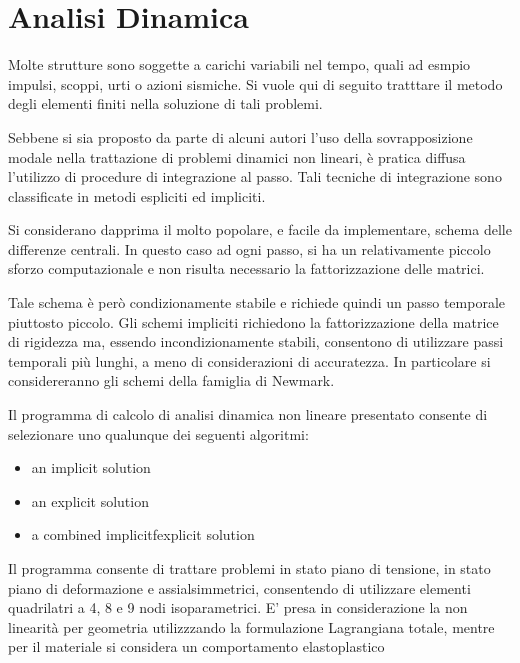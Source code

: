 \chapter{Analisi Dinamica}		
Molte strutture sono soggette a carichi variabili nel tempo, quali ad esmpio impulsi, scoppi, urti o azioni sismiche. Si vuole qui di seguito tratttare il metodo degli elementi finiti nella soluzione di tali problemi.

Sebbene si sia proposto da parte di alcuni autori l'uso della sovrapposizione modale nella trattazione di problemi dinamici non lineari, è pratica diffusa l'utilizzo di procedure di integrazione al passo. Tali tecniche di integrazione sono classificate in metodi espliciti ed impliciti.

Si considerano dapprima il molto popolare, e facile da implementare, schema delle differenze centrali.
In questo caso ad ogni passo, si ha un relativamente piccolo sforzo computazionale e non risulta necessario la fattorizzazione delle matrici.

Tale schema è però condizionamente stabile e richiede quindi un passo temporale piuttosto piccolo.
Gli schemi impliciti richiedono la fattorizzazione della matrice di rigidezza ma, essendo incondizionamente stabili, consentono di utilizzare passi temporali più lunghi, a meno di considerazioni di accuratezza. In particolare si considereranno gli schemi della famiglia di Newmark.

Il programma di calcolo di analisi dinamica non lineare presentato consente di selezionare uno qualunque dei seguenti algoritmi:
\begin{itemize}
	\item an implicit solution
	\item an explicit solution
	\item a combined implicitfexplicit solution
\end{itemize}

Il programma consente di trattare problemi in stato piano di tensione, in stato piano di deformazione e assialsimmetrici, consentendo di utilizzare elementi quadrilatri a 4, 8 e 9 nodi isoparametrici. E' presa in considerazione la non linearità per geometria utilizzzando la formulazione Lagrangiana totale, mentre per il materiale si considera un comportamento elastoplastico

